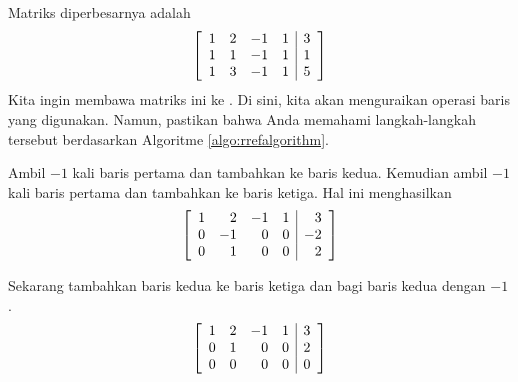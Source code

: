 \begin{solution} Matriks diperbesarnya adalah
\begin{equation*}
\left[
\begin{array}{rrrr|r}
1 & 2 & -1 & 1 & 3 \\
1 & 1 & -1 & 1 & 1 \\
1 & 3 & -1 & 1 & 5
\end{array}
\right] 
\end{equation*}
Kita ingin membawa matriks ini ke \ef. Di sini, kita akan menguraikan operasi baris yang digunakan. Namun, pastikan bahwa Anda
memahami langkah-langkah tersebut berdasarkan Algoritme \ref{algo:rrefalgorithm}.

Ambil $-1$ kali baris pertama dan tambahkan ke baris kedua. Kemudian ambil $-1$ kali
baris pertama dan tambahkan ke baris ketiga. Hal ini menghasilkan
\begin{equation*}
\left[
\begin{array}{rrrr|r}
1 & 2 & -1 & 1 & 3 \\
0 & -1 & 0 & 0 & -2 \\
0 & 1 & 0 & 0 & 2
\end{array}
\right]
\end{equation*}

Sekarang tambahkan baris kedua ke baris ketiga dan bagi baris kedua dengan $-1$.
\begin{equation}
\left[
\begin{array}{rrrr|r}
1 & 2 & -1 & 1 & 3 \\
0 & 1 & 0 & 0 & 2 \\
0 & 0 & 0 & 0 & 0
\end{array}
\right]  \label{twoparameters1}
\end{equation}



\end{solution}
